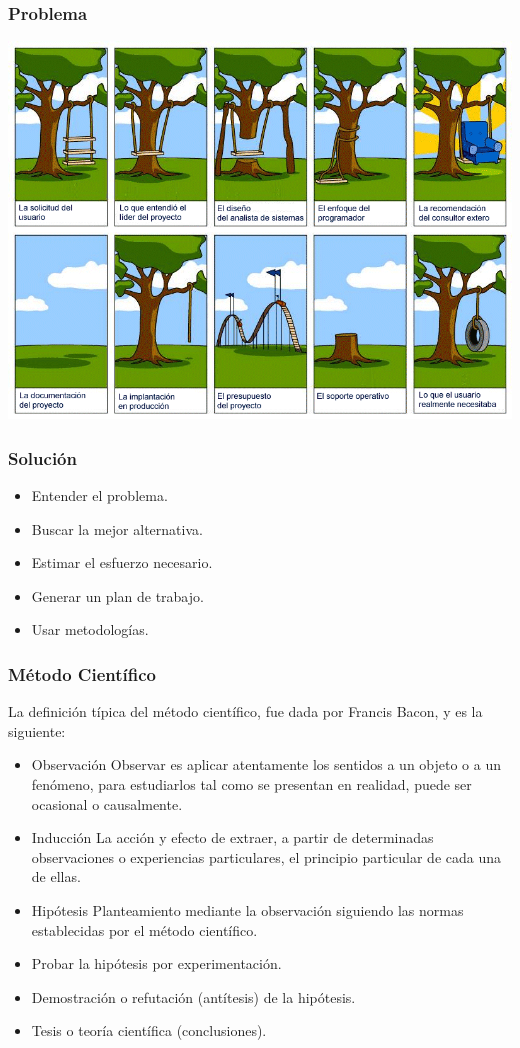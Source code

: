 \documentclass[12pt]{beamer}
\begin{document}
\begin{frame}
\frametitle{Problema}
  \includegraphics[scale=0.30]{img/sin-metodologias.png}
\end{frame}




\begin{frame}
\frametitle{Solución}
  \begin{itemize}
   \item<1-> Entender el problema.
   \item<2-> Buscar la mejor alternativa.
   \item<3-> Estimar el esfuerzo necesario.
   \item<4-> Generar un plan de trabajo.
   \item<5-> Usar \alert{metodologías}.
  \end{itemize}
\end{frame}


\begin{frame}
 \frametitle{Método Científico}
  La definición típica del método científico, fue dada por Francis Bacon, y es la siguiente:
  \begin{itemize}
   \item<2-> \alert{Observación} Observar es aplicar atentamente los sentidos a un objeto o a un fenómeno, para estudiarlos tal como se presentan en realidad, puede ser ocasional o causalmente.
   \item<3-> \alert{Inducción} La acción y efecto de extraer, a partir de determinadas observaciones o experiencias particulares, el principio particular de cada una de ellas.
   \item<4-> \alert{Hipótesis} Planteamiento mediante la observación siguiendo las normas establecidas por el método científico.
   \item<5-> Probar la hipótesis por \alert{experimentación}.
   \item<6-> \alert{Demostración} o \alert{refutación} (antítesis) de la hipótesis.
   \item<7-> Tesis o teoría científica (\alert{conclusiones}).
  \end{itemize}
\end{frame}
\end{document}
